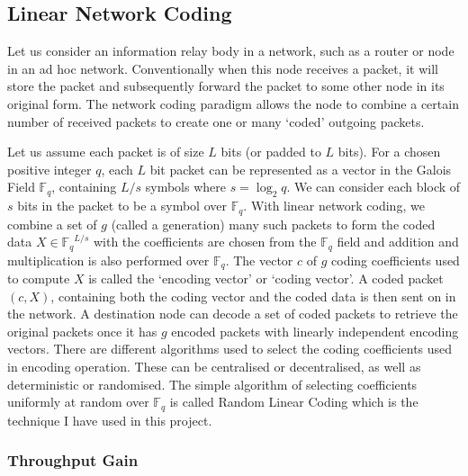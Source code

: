 \documentclass[12pt,a4paper,twoside,openright]{report}
\begin{document}
\subsection{Linear Network Coding}

Let us consider an information relay body in a network, such as a router or node in an ad hoc network. Conventionally when this node receives a packet, it will store the packet and subsequently forward the packet to some other node in its original form. The network coding paradigm allows the node to combine a certain number of received packets to create one or many `coded' outgoing packets. 

Let us assume each packet is of size $L$ bits (or padded to $L$ bits). For a chosen positive integer $q$, each $L$ bit packet can be represented as a vector in the Galois Field $\mathbb{F}_q$, containing $L/s$ symbols where $s = \log_2 q$. We can consider each block of $s$ bits in the packet to be a symbol over $\mathbb{F}_q$. With linear network coding, we combine a set of $g$ (called a generation) many such packets to form the coded data $X \in {\mathbb{F}_q}^{L/s}$ with the coefficients are chosen from the $\mathbb{F}_q$ field and addition and multiplication is also performed over $\mathbb{F}_q$. The vector $c$ of $g$ coding coefficients used to compute $X$ is called the `encoding vector' or `coding vector'. A coded packet $(c, X)$, containing both the coding vector and the coded data is then sent on in the network. A destination node can decode a set of coded packets to retrieve the original packets once it has $g$ encoded packets with linearly independent encoding vectors. There are different algorithms used to select the coding coefficients used in encoding operation. These can be centralised or decentralised, as well as deterministic or randomised. The simple algorithm of selecting coefficients uniformly at random over $\mathbb{F}_q$ is called Random Linear Coding which is the technique I have used in this project. 


\subsubsection{Throughput Gain}
\end{document}
